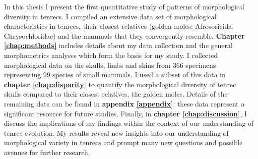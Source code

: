 	In this thesis I present the first quantitative study of patterns of morphological diversity in tenrecs. I compiled an extensive data set of morphological characteristics in tenrecs, their closest relatives (golden moles; Afrosoricida, Chrysochloridae) and the mammals that they convergently resemble. \textbf{Chapter \ref{chap:methods}} includes details about my data collection and the general morphometrics analyses which form the basis for my study. I collected morphological data on the skulls, limbs and skins from 366 specimens representing 99 species of small mammals. I used a subset of this data in \textbf{chapter \ref{chap:disparity}} to quantify the morphological diversity of tenrec skulls compared to their closest relatives, the golden moles. Details of the remaining data can be found in \textbf{appendix \ref{appendix}}: these data represent a significant resource for future studies. Finally, in \textbf{chapter \ref{chap:discussion}}, I discuss the implications of my findings within the context of our understanding of tenrec evolution. %
 	My results reveal new insights into our understanding of morphological variety in tenrecs and prompt many new questions and possible avenues for further research.


